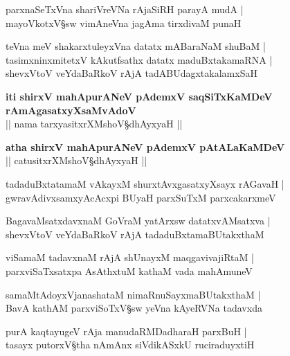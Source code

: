 \begin{shloka}
parxnaSeTxVna shariVreVNa rAjaSiRH parayA mudA |\\
mayoVkotxV\S sw vimAneVna jagAma tirxdivaM punaH 
\end{shloka}

\begin{shloka}
teVna meV shakarxtuleyxVna datatx mABaraNaM shuBaM |\\
tasimxninxmitetxV kAkutfsathx datatx maduBxtakamaRNA |\\
shevxVtoV veYdaBaRkoV rAjA tadABUdagxtakalamxSaH 
\end{shloka}

\begin{center}
\textbf{iti shirxV mahApurANeV pAdemxV saqSiTxKaMDeV rAmAgasatxyXsaMvAdoV}\\
|| nama tarxyasitxrXMshoV\S dhAyxyaH ||
\end{center}

\setcounter{shloka}{0}
\begin{center}
\textbf{atha shirxV mahApurANeV pAdemxV pAtALaKaMDeV}\\
|| catusitxrXMshoV\S dhAyxyaH ||
\end{center}

\begin{shloka}
tadaduBxtatamaM vAkayxM shurxtAvxgasatxyXsayx rAGavaH |\\
gwravAdivxsamxyAcAcxpi BUyaH parxSuTxM parxcakarxmeV 
\end{shloka}

\begin{shloka}
BagavaMsatxdavxnaM GoVraM yatArxsw datatxvAMsatxva |\\
shevxVtoV veYdaBaRkoV rAjA tadaduBxtamaBUtakxthaM 
\end{shloka}

\begin{shloka}
viSamaM tadavxnaM rAjA shUnayxM maqgavivajiRtaM |\\
parxviSaTxsatxpa AsAthxtuM kathaM vada mahAmuneV 
\end{shloka}

\begin{shloka}
samaMtAdoyxVjanashataM nimaRnuSayxmaBUtakxthaM |\\
BavA\R{} kathAM parxviSoTxV\S sw yeVna kAyeRVNa tadavxda
\end{shloka}

\begin{shloka}
purA kaqtayugeV rAja\R{} manudaRMDadharaH parxBuH |\\
tasayx putorxV\S tha nAmAnx siVdikASxkU ruciraduyxtiH 
\end{shloka}

